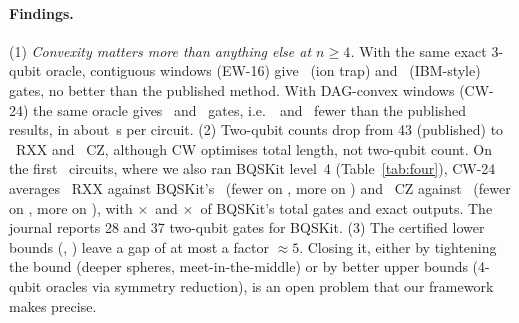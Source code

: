\paragraph{Findings.} (1) \emph{Convexity matters more than anything else at $n\ge4$.} With the same exact 3-qubit
oracle, contiguous windows (EW-16) give \EWFourIon\ (ion trap) and \EWFourIbm\ (IBM-style) gates, no better than the
published method. With DAG-convex windows (CW-24) the same oracle gives \CWFourIon\ and \CWFourIbm\ gates, i.e.\
\FourImprovementIon\ and \FourImprovementIbm\ fewer than the published results, in about \CWFourSec\,s per circuit. (2)
Two-qubit counts drop from 43 (published) to \CWFourIonTwoQ\ RXX and \CWFourIbmTwoQ\ CZ, although CW optimises
total length, not two-qubit count. On the first \CWBqIonN\ circuits, where we also ran BQSKit level~4
(Table~\ref{tab:four}), CW-24 averages \CWBqIonTwoQ\ RXX against BQSKit's \BqFourIonTwoQ\ (fewer on \CWBqIonFewer, more
on \CWBqIonMore) and \CWBqIbmTwoQ\ CZ against \BqFourIbmTwoQ\ (fewer on \CWBqIbmFewer, more on \CWBqIbmMore), with
$\times$\CWBqIonTotalRatio\ and $\times$\CWBqIbmTotalRatio\ of BQSKit's total gates and exact outputs. The journal
reports 28 and 37 two-qubit gates for BQSKit. (3) The certified lower bounds
(\LBFourIon, \LBFourIbm) leave a gap of at most a factor $\approx5$. Closing it, either by tightening the bound (deeper spheres,
meet-in-the-middle) or by better upper bounds (4-qubit oracles via symmetry reduction), is an open problem that our framework
makes precise.

